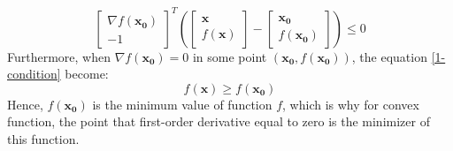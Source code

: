 \documentclass[10pt,a4paper]{article}
\begin{document}
\begin{equation*}
	\begin{bmatrix}
	\nabla f(\mathbf{x_{0}}) \\
	-1
	\end{bmatrix} ^{T}(
	\begin{bmatrix}
		\mathbf{x} \\
		f(\mathbf{x})
	\end{bmatrix} - 
	\begin{bmatrix}
		\mathbf{x_{0}} \\
		f(\mathbf{x_{0}})
	\end{bmatrix}) \leq 0
\end{equation*}
Furthermore, when $\nabla f(\mathbf{x_{0}}) = 0$ in some point $(\mathbf{x_{0}}, f(\mathbf{x_{0}}))$, the equation \ref{1-condition} become:
\begin{equation*}
	f(\mathbf{x}) \geq f(\mathbf{x_{0}})
\end{equation*}
Hence, $f(\mathbf{x_{0}})$ is the minimum value of function $f$, which is why for convex function, the point that first-order derivative equal to zero is the minimizer of this function.
\end{document}
